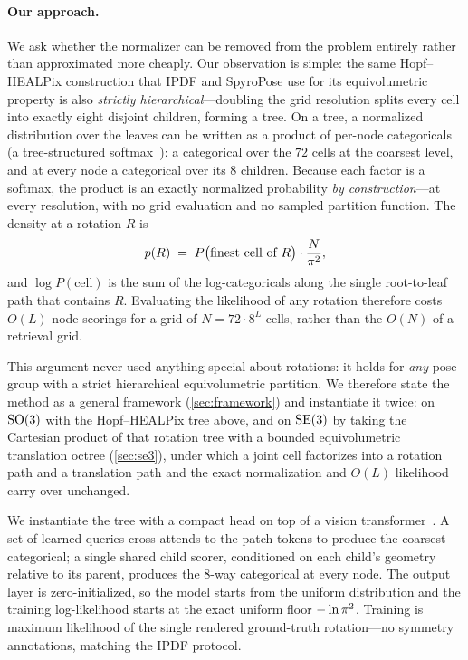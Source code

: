 \paragraph{Our approach.}
We ask whether the normalizer can be removed from the problem entirely rather
than approximated more cheaply. Our observation is simple: the same
Hopf--HEALPix construction that IPDF and SpyroPose use for its equivolumetric
property is also \emph{strictly hierarchical}---doubling the grid resolution
splits every cell into exactly eight disjoint children, forming a tree. On a
tree, a normalized distribution over the leaves can be written as a product of
per-node categoricals (a tree-structured softmax~\cite{morin2005hierarchical}): a categorical over
the $72$ cells at the coarsest level, and at every node a categorical over its
$8$ children. Because each factor is a softmax, the product is an exactly
normalized probability \emph{by construction}---at every resolution, with no grid
evaluation and no sampled partition function. The density at a rotation $R$ is
\begin{equation}
  p(R) \;=\; P\big(\text{finest cell of } R\big)\cdot \frac{N}{\pi^2},
\end{equation}
and $\log P(\text{cell})$ is the sum of the log-categoricals along the single
root-to-leaf path that contains $R$. Evaluating the likelihood of any rotation
therefore costs $O(L)$ node scorings for a grid of $N=72\cdot 8^{L}$ cells,
rather than the $O(N)$ of a retrieval grid.

This argument never used anything special about rotations: it holds for \emph{any}
pose group with a strict hierarchical equivolumetric partition. We therefore state
the method as a general framework (\cref{sec:framework}) and instantiate it twice:
on $\mathrm{SO}(3)$ with the Hopf--HEALPix tree above, and on $\mathrm{SE}(3)$ by taking the
Cartesian product of that rotation tree with a bounded equivolumetric translation
octree (\cref{sec:se3}), under which a joint cell factorizes into a rotation path
and a translation path and the exact normalization and $O(L)$ likelihood carry over
unchanged.

We instantiate the tree with a compact head on top of a vision
transformer~\cite{dosovitskiy2021vit}. A set of learned queries cross-attends to
the patch tokens to produce the coarsest categorical; a single shared child
scorer, conditioned on each child's geometry relative to its parent, produces the
$8$-way categorical at every node. The output layer is zero-initialized, so the
model starts from the uniform distribution and the training log-likelihood starts
at the exact uniform floor $-\ln \pi^2$. Training is maximum likelihood of the
single rendered ground-truth rotation---no symmetry annotations, matching the
IPDF protocol.


